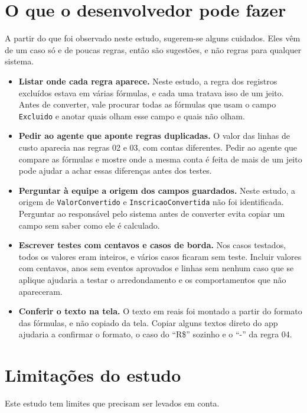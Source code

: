 \section{O que o desenvolvedor pode fazer}
\label{sec:desenvolvedor}

A partir do que foi observado neste estudo, sugerem-se alguns cuidados. Eles vêm de um caso só e de poucas regras, então são sugestões, e não regras para qualquer sistema.

\begin{itemize}
    \item \textbf{Listar onde cada regra aparece.} Neste estudo, a regra dos registros excluídos estava em várias fórmulas, e cada uma tratava isso de um jeito. Antes de converter, vale procurar todas as fórmulas que usam o campo \texttt{Excluido} e anotar quais olham esse campo e quais não olham.
    \item \textbf{Pedir ao agente que aponte regras duplicadas.} O valor das linhas de custo aparecia nas regras 02 e 03, com contas diferentes. Pedir ao agente que compare as fórmulas e mostre onde a mesma conta é feita de mais de um jeito pode ajudar a achar essas diferenças antes dos testes.
    \item \textbf{Perguntar à equipe a origem dos campos guardados.} Neste estudo, a origem de \texttt{Valor\allowbreak Convertido} e \texttt{Inscricao\allowbreak Convertida} não foi identificada. Perguntar ao responsável pelo sistema antes de converter evita copiar um campo sem saber como ele é calculado.
    \item \textbf{Escrever testes com centavos e casos de borda.} Nos casos testados, todos os valores eram inteiros, e vários casos ficaram sem teste. Incluir valores com centavos, anos sem eventos aprovados e linhas sem nenhum caso que se aplique ajudaria a testar o arredondamento e os comportamentos que não apareceram.
    \item \textbf{Conferir o texto na tela.} O texto em reais foi montado a partir do formato das fórmulas, e não copiado da tela. Copiar alguns textos direto do app ajudaria a confirmar o formato, o caso do ``R\$'' sozinho e o ``-'' da regra 04.
\end{itemize}

\section{Limitações do estudo}
\label{sec:limitacoes}

Este estudo tem limites que precisam ser levados em conta.

